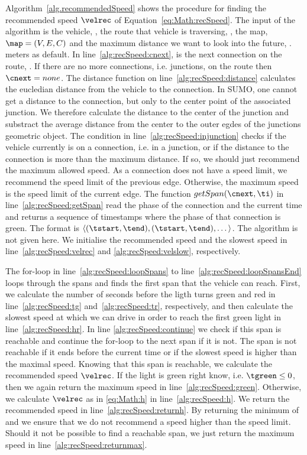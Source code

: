Algorithm~\ref{alg.recommendedSpeed} shows the procedure for finding the recommended speed $\velrec$ of Equation~\ref{eq:Math:recSpeed}.
The input of the algorithm is the vehicle, \veh, the route that vehicle is traversing, \route, the map, $\map = (V, E, C)$ and the maximum distance we want to look into the future, \distmax. 
 meters as default. %
In line~\ref{alg:recSpeed:cnext}, \cnext is the next connection on the route, \route. If there are no more connections, i.e. junctions, on the route then $\cnext=none$.
The distance function on line~\ref{alg:recSpeed:distance} calculates the eucledian distance from the vehicle to the connection.
In SUMO, one cannot get a distance to the connection, but only to the center point of the associated junction.
We therefore calculate the distance to the center of the junction and substract the average distance from the center to the outer egdes of the junctions geometric object. 
The condition in line~\ref{alg:recSpeed:injunction} checks if the vehicle currently is on a connection, i.e. in a junction, or if the distance to the connection is more than the maximum distance. 
If so, we should just recommend the maximum allowed speed. 
As a connection does not have a speed limit, we recommend the speed limit of the previous edge.
Otherwise, the maximum speed is the speed limit of the current edge.
The function $getSpan(\cnext, \ti)$ in line~\ref{alg:recSpeed:getSpan} read the phase of the connection and the current time and returns a sequence of timestamps where the phase of that connection is green. The format is $\langle(\tstart, \tend), (\tstart, \tend), \dots\rangle$.
The algorithm is not given here.
We initialise the recommended speed and the slowest speed in line~\ref{alg:recSpeed:velrec} and \ref{alg:recSpeed:velslow}, respectively.

The for-loop in line~\ref{alg:recSpeed:loopSpans} to line~\ref{alg:recSpeed:loopSpansEnd} loops through the spans and finds the first span that the vehicle can reach.
First, we calculate the number of seconds before the ligth turns green and red in line~\ref{alg:recSpeed:tg} and~\ref{alg:recSpeed:tr}, respectively, and then calculate the slowest speed at which we can drive in order to reach the first green light in line~\ref{alg:recSpeed:hr}.
In line \ref{alg:recSpeed:continue} we check if this span is reachable and continue the for-loop to the next span if it is not. 
The span is not reachable if it ends before the current time or if the slowest speed is higher than the maximal speed.
Knowing that this span is reachable, we calculate the recommended speed $\velrec$.
If the light is green right know, i.e. $\tgreen \leq 0$, then we again return the maximum speed in line~\ref{alg:recSpeed:green}. 
Otherwise, we calculate $\velrec$ as in \eqref{eq:Math:h} in line~\ref{alg:recSpeed:h}.
We return the recommended speed in line~\ref{alg:recSpeed:returnh}.
By returning the minimum of \velrec and \velmax we ensure that we do not recommend a speed higher than the speed limit.
Should it not be possible to find a reachable span, we just return the maximum speed in line~\ref{alg:recSpeed:returnmax}.

